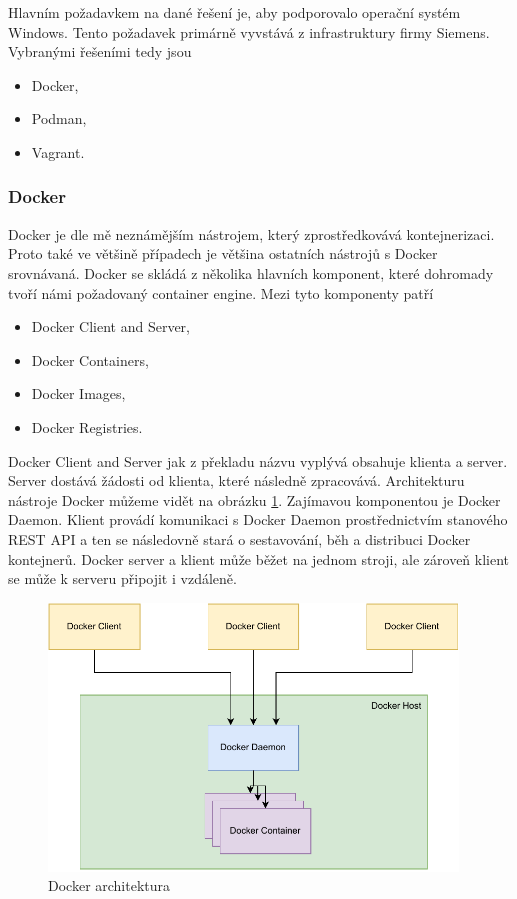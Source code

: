 Hlavním požadavkem na dané řešení je, aby podporovalo operační systém Windows. Tento požadavek primárně vyvstává z infrastruktury firmy Siemens. Vybranými řešeními tedy jsou

\begin{itemize}
    \item Docker,
    \item Podman,
    \item Vagrant. 
\end{itemize}

\subsubsection{Docker}
Docker je dle mě neznámějším nástrojem, který zprostředkovává kontejnerizaci. Proto také ve většině případech je většina ostatních nástrojů s Docker srovnávaná. Docker se skládá z několika hlavních komponent, které dohromady tvoří námi požadovaný container engine. Mezi tyto komponenty patří

\begin{itemize}
    \item Docker Client and Server,
    \item Docker Containers,
    \item Docker Images,
    \item Docker Registries.
\end{itemize}

Docker Client and Server jak z překladu názvu vyplývá obsahuje klienta a server. Server dostává žádosti od klienta, které následně zpracovává. Architekturu nástroje Docker můžeme vidět na obrázku \ref{fig:docker_arch}. Zajímavou komponentou je Docker Daemon. Klient provádí komunikaci s Docker Daemon prostřednictvím stanového REST API a ten se následovně stará o sestavování, běh a distribuci Docker kontejnerů. Docker server a klient může běžet na jednom stroji, ale zároveň klient se může k serveru připojit i vzdáleně. 
\cite{turnbull2014docker}\cite{docker_overview}

\begin{figure}[htbp]
    \centering 
    \includegraphics[width=0.97\textwidth]{assets/img/docker_arch.pdf}
    \caption{Docker architektura}
    \label{fig:docker_arch}
\end{figure}

